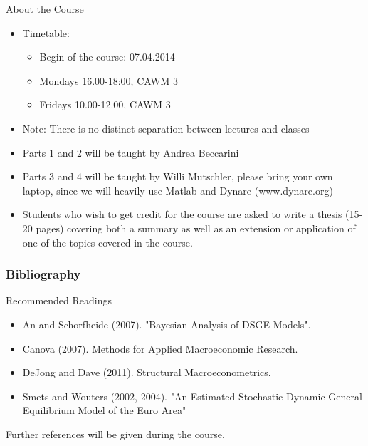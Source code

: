 \documentclass{beamer} %
\begin{document}
\begin{frame}{About the Course}
\begin{itemize}
\item Timetable: 
	\begin{itemize}
	\item Begin of the course: 07.04.2014
	\item Mondays 16.00-18:00, CAWM 3
	\item Fridays 10.00-12.00, CAWM 3
	\end{itemize}
\item Note: There is no distinct separation between lectures and classes
\item Parts 1 and 2 will be taught by Andrea Beccarini
\item Parts 3 and 4 will be taught by Willi Mutschler, please bring your own laptop, since we will heavily use Matlab and Dynare (www.dynare.org)
\item Students who wish to get credit for the course are asked to write a thesis (15-20 pages) covering both a summary as well as an extension or application of one of the topics covered in the course.
\end{itemize}
\end{frame}

\begin{frame}\frametitle{Bibliography}
Recommended Readings
\begin{itemize}
\item An and Schorfheide (2007). "Bayesian Analysis of DSGE Models".
\item Canova (2007). Methods for Applied Macroeconomic Research.
\item DeJong and Dave (2011). Structural Macroeconometrics.
\item Smets and Wouters (2002, 2004). "An Estimated Stochastic Dynamic General Equilibrium Model of the Euro Area"
\end{itemize}
Further references will be given during the course.

\end{frame}
\end{document}

